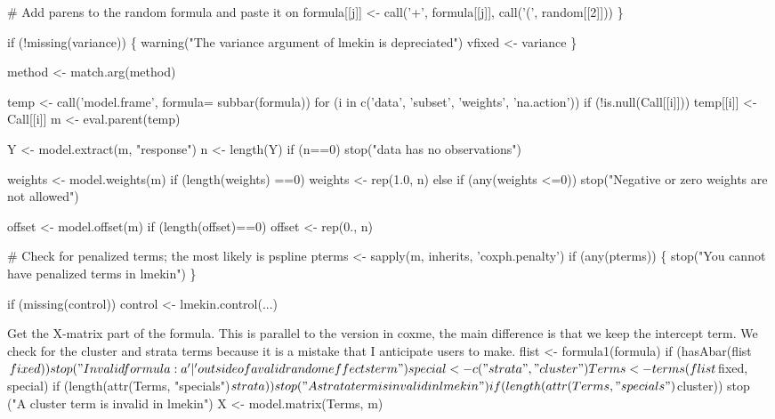 \documentclass{article}
\begin{document}
    # Add parens to the random formula and paste it on
    formula[[j]] <- call('+', formula[[j]], call('(', random[[2]]))  
    \}

if (!missing(variance)) \{
    warning("The variance argument of lmekin is depreciated")
    vfixed <- variance
    \}

method <- match.arg(method)

temp <- call('model.frame', formula= subbar(formula))
for (i in c('data', 'subset', 'weights', 'na.action'))
    if (!is.null(Call[[i]])) temp[[i]] <- Call[[i]]
m <- eval.parent(temp)

Y <- model.extract(m, "response")
n <- length(Y)
if (n==0) stop("data has no observations")

weights <- model.weights(m)
if (length(weights) ==0) weights <- rep(1.0, n)
else if (any(weights <=0))
    stop("Negative or zero weights are not allowed")

offset <- model.offset(m)
if (length(offset)==0) offset <- rep(0., n)

# Check for penalized terms; the most likely is pspline
pterms <- sapply(m, inherits, 'coxph.penalty')
if (any(pterms)) \{
    stop("You cannot have penalized terms in lmekin")
    \}

if (missing(control)) control <- lmekin.control(...)
\nwendcode{}\nwdocspar

Get the X-matrix part of the formula.
This is parallel to the version in coxme, the main difference is
that we keep the intercept term.
We check for the cluster and strata terms because it is a mistake
that I anticipate users to make.
\nwenddocs{}\endmoddef
flist <- formula1(formula)
if (hasAbar(flist$fixed))
    stop("Invalid formula: a '|' outside of a valid random effects term")

special <- c("strata", "cluster")
Terms <- terms(flist$fixed, special)
if (length(attr(Terms, "specials")$strata))
    stop ("A strata term is invalid in lmekin")
if (length(attr(Terms, "specials")$cluster))
    stop ("A cluster term is invalid in lmekin")
X <- model.matrix(Terms, m)
\nwendcode{}\nwdocspar
    
\end{document}
